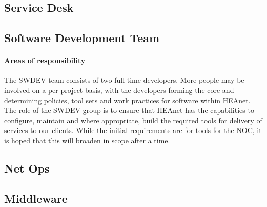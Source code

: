 \documentclass{article}
\begin{document}
	\subsection{Service Desk}
	\subsection{Software Development Team}
	\paragraph{Areas of responsibility \newline}
	The SWDEV team consists of two full time developers.
	More people may be involved on a per project basis, with the developers forming the core and determining policies, tool sets and work practices for software within HEAnet.
	The role of the SWDEV group is to ensure that HEAnet has the capabilities to configure, maintain and where appropriate, build the required tools for delivery of services to our clients. While the initial requirements are for tools for the NOC, it is hoped that this will broaden in scope after a time.
	\subsection{Net Ops}
	\subsection{Middleware}
\end{document}
